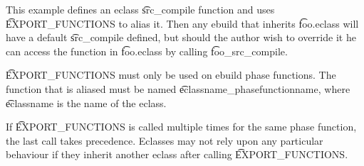 This example defines an eclass \t{src_compile} function and uses \t{EXPORT_FUNCTIONS} to alias
it. Then any ebuild that inherits \t{foo.eclass} will have a default \t{src_compile} defined, but
should the author wish to override it he can access the function in \t{foo.eclass} by calling
\t{foo_src_compile}.

\t{EXPORT_FUNCTIONS} must only be used on ebuild phase functions. The function that is aliased
must be named \t{eclassname_phasefunctionname}, where \t{eclassname} is the name of the eclass.

If \t{EXPORT_FUNCTIONS} is called multiple times for the same phase function, the last call takes
precedence. Eclasses may not rely upon any particular behaviour if they inherit another eclass
after calling \t{EXPORT_FUNCTIONS}.


